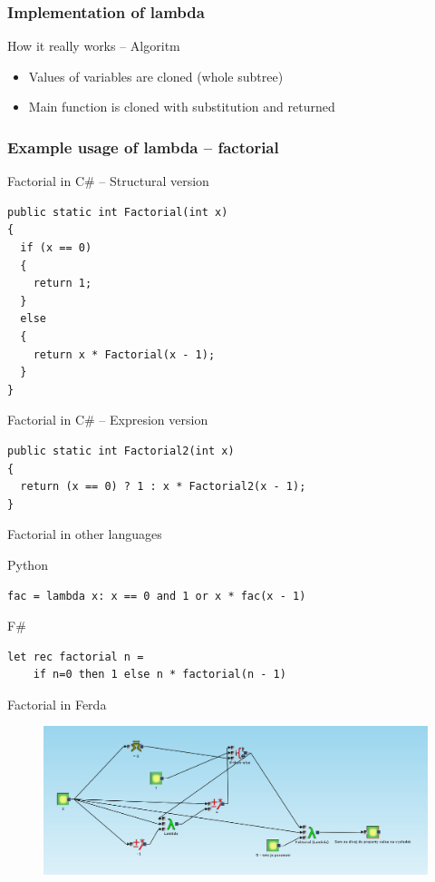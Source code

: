 \documentclass{article}
\begin{document}
\subsubsection{Implementation of lambda}
How it really works -- Algoritm
\begin{itemize}
	\item Values of variables are cloned (whole subtree)
	\item Main function is cloned with substitution and returned
\end{itemize}

\subsubsection{Example usage of lambda -- factorial}
Factorial in C\# -- Structural version

\begin{verbatim}
public static int Factorial(int x)
{
  if (x == 0)
  {
    return 1;
  }
  else
  {
    return x * Factorial(x - 1);
  }
}
\end{verbatim}
	
Factorial in C\# -- Expresion version

\begin{verbatim}
public static int Factorial2(int x)
{
  return (x == 0) ? 1 : x * Factorial2(x - 1);
}
\end{verbatim}

Factorial in other languages

Python
\begin{verbatim}
fac = lambda x: x == 0 and 1 or x * fac(x - 1)
\end{verbatim}

F\#
\begin{verbatim}
let rec factorial n =
    if n=0 then 1 else n * factorial(n - 1)
\end{verbatim}
	
Factorial in Ferda
\begin{figure}
\includegraphics[width=12cm]{faktorial}
	\caption{}
\end{figure}
\end{document}

